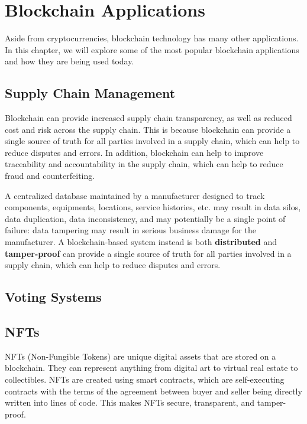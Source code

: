 \chapter{Blockchain Applications}
Aside from cryptocurrencies, blockchain technology has many other applications. In this chapter, we will explore some of the most popular blockchain applications and how they are being used today.

\section{Supply Chain Management}
Blockchain can provide increased supply chain transparency, as well as
reduced cost and risk across the supply chain. This is because blockchain can provide a single source of truth for all parties involved in a supply chain, which can help to reduce disputes and errors. In addition, blockchain can help to improve traceability and accountability in the supply chain, which can help to reduce fraud and counterfeiting.

A centralized database maintained by a manufacturer designed to track components, equipments, locations, service histories, etc. may result in data silos, data duplication, data inconsistency, and may potentially be a single point of failure: data tampering may result in serious business damage for the manufacturer.
A blockchain-based system instead is both \textbf{distributed} and \textbf{tamper-proof} can provide a single source of truth for all parties involved in a supply chain, which can help to reduce disputes and errors.

\section{Voting Systems}

\section{NFTs}
NFTs (Non-Fungible Tokens) are unique digital assets that are stored on a blockchain. They can represent anything from digital art to virtual real estate to collectibles. NFTs are created using smart contracts, which are self-executing contracts with the terms of the agreement between buyer and seller being directly written into lines of code. This makes NFTs secure, transparent, and tamper-proof.

